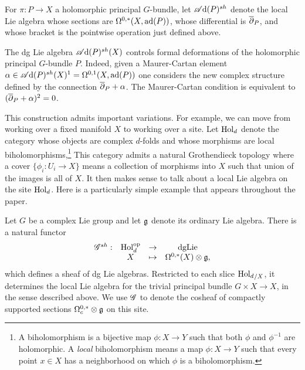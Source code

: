 \begin{dfn}\label{dfn: adjoint local}
For $\pi : P \to X$ a holomorphic principal $G$-bundle,
let $\mathscr A{\rm d}(P)^{sh}$ denote the local Lie algebra whose sections are $\Omega^{0,*}(X,{\rm ad}(P))$,
whose differential is $\overline{\partial}_P$, and whose bracket is the pointwise operation just defined above.
\end{dfn}


The dg Lie algebra $\mathscr A{\rm d}(P)^{sh}(X)$ controls formal deformations of the holomorphic principal $G$-bundle $P$. 
Indeed, given a Maurer-Cartan element $\alpha \in \mathscr A{\rm d}(P)^{sh}(X)^1 = \Omega^{0,1}(X, {\rm ad}(P))$ one considers the new complex structure defined by the connection $\overline{\partial}_P + \alpha$. 
The Maurer-Cartan condition is equivalent to $(\overline{\partial}_P + \alpha)^2 = 0$. 

This construction admits important variations.
For example, we can move from working over a fixed manifold $X$ to working over a site.
Let ${\rm Hol}_d$ denote the category whose objects are complex $d$-folds and whose morphisms are local biholomorphisms,\footnote{A biholomorphism is a bijective map $\phi: X \to Y$ such that both $\phi$ and $\phi^{-1}$ are holomorphic. A {\em local} biholomorphism means a map $\phi: X \to Y$ such that every point $x \in X$ has a neighborhood on which $\phi$ is a biholomorphism.}
This category admits a natural Grothendieck topology where a cover $\{\phi_i: U_i \to X\}$ means a collection of morphisms into $X$ such that union of the images is all of $X$.
It then makes sense to talk about a local Lie algebra on the site ${\rm Hol}_d$.
Here is a particularly simple example that appears throughout the paper.

\begin{dfn}
Let $G$ be a complex Lie group and let $\mathfrak g$ denote its ordinary Lie algebra.
There is a natural functor 
\[
\begin{array}{cccc}
\mathscr G^{sh} :&  {\rm Hol}_d^{\rm op} & \to & {{\rm dgLie}}\\
& X & \mapsto &\Omega^{0,*}(X) \otimes \mathfrak g,
\end{array}
\]
which defines a sheaf of dg Lie algebras.
Restricted to each slice ${{\rm Hol}_d}_{/X}$, it determines the local Lie algebra for the trivial principal bundle $G \times X \to X$, in the sense described above.
We use $\mathscr G$ to denote the cosheaf of compactly supported sections $\Omega^{0,*}_c \otimes \mathfrak g$ on this site.
\end{dfn}

